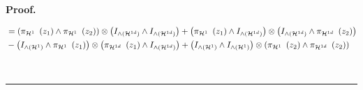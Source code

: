 \documentclass[aps,preprint]{revtex4}%
\newenvironment{proof}[1][Proof]{\noindent\textbf{#1.} }{\ \rule{0.5em}{0.5em}}
\begin{document}
\begin{proof}
\begin{enumerate}
\begin{align}
&  =\left(  \pi_{\mathcal{H}^{1}\mathcal{\ }}\left(  z_{1}\right)  \wedge
\pi_{\mathcal{H}^{1}\mathcal{\ }}\left(  z_{2}\right)  \right)  \otimes\left(
I_{{\huge \wedge}\left(  \mathcal{H}^{1d}\right)  }\wedge I_{{\huge \wedge
}\left(  \mathcal{H}^{1d}\right)  }\right)  +\left(  \pi_{\mathcal{H}%
^{1}\mathcal{\ }}\left(  z_{1}\right)  \wedge I_{{\huge \wedge}\left(
\mathcal{H}^{1d}\right)  }\right)  \otimes\left(  I_{{\huge \wedge}\left(
\mathcal{H}^{1d}\right)  }\wedge\pi_{\mathcal{H}^{1d}\mathcal{\ }}\left(
z_{2}\right)  \right) \\
&  -\left(  I_{{\huge \wedge}\left(  \mathcal{H}^{1}\right)  }\wedge
\pi_{\mathcal{H}^{1}\mathcal{\ }}\left(  z_{1}\right)  \right)  \otimes\left(
\pi_{\mathcal{H}^{1d}\mathcal{\ }}\left(  z_{1}\right)  \wedge
I_{{\huge \wedge}\left(  \mathcal{H}^{1d}\right)  }\right)  +\left(
I_{{\huge \wedge}\left(  \mathcal{H}^{1}\right)  }\wedge I_{{\huge \wedge
}\left(  \mathcal{H}^{1}\right)  }\right)  \otimes\left(  \pi_{\mathcal{H}%
^{1}\mathcal{\ }}\left(  z_{2}\right)  \wedge\pi_{\mathcal{H}^{1d}%
\mathcal{\ }}\left(  z_{2}\right)  \right)
\end{align}



\end{enumerate}
\end{proof}
\end{document}
